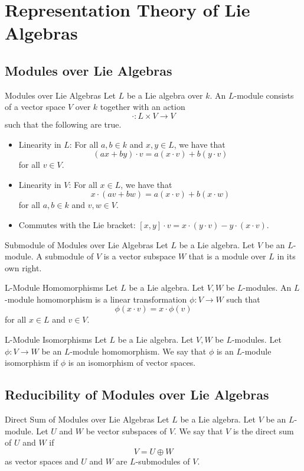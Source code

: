 \documentclass[a4paper]{article}
\begin{document}
\pagebreak
\section{Representation Theory of Lie Algebras}
\subsection{Modules over Lie Algebras}
\begin{defn}{Modules over Lie Algebras}{} Let $L$ be a Lie algebra over $k$. An $L$-module consists of a vector space $V$ over $k$ together with an action $$\cdot:L\times V\to V$$ such that the following are true. 
\begin{itemize}
\item Linearity in $L$: For all $a,b\in k$ and $x,y\in L$, we have that $$(ax+by)\cdot v=a(x\cdot v)+b(y\cdot v)$$ for all $v\in V$. 
\item Linearity in $V$: For all $x\in L$, we have that $$x\cdot(av+bw)=a(x\cdot v)+b(x\cdot w)$$ for all $a,b\in k$ and $v,w\in V$. 
\item Commutes with the Lie bracket: $[x,y]\cdot v=x\cdot(y\cdot v)-y\cdot(x\cdot v)$. 
\end{itemize}
\end{defn}

\begin{defn}{Submodule of Modules over Lie Algebras}{} Let $L$ be a Lie algebra. Let $V$ be an $L$-module. A submodule of $V$ is a vector subspace $W$ that is a module over $L$ in its own right. 
\end{defn}

\begin{defn}{L-Module Homomorphisms}{} Let $L$ be a Lie algebra. Let $V,W$ be $L$-modules. An $L$-module homomorphism is a linear transformation $\phi:V\to W$ such that $$\phi(x\cdot v)=x\cdot\phi(v)$$ for all $x\in L$ and $v\in V$. 
\end{defn}

\begin{defn}{L-Module Isomorphisms}{} Let $L$ be a Lie algebra. Let $V,W$ be $L$-modules. Let $\phi:V\to W$ be an $L$-module homomorphism. We say that $\phi$ is an $L$-module isomorphism if $\phi$ is an isomorphism of vector spaces. 
\end{defn}

\subsection{Reducibility of Modules over Lie Algebras}
\begin{defn}{Direct Sum of Modules over Lie Algebras}{} Let $L$ be a Lie algebra. Let $V$ be an $L$-module. Let $U$ and $W$ be vector subspaces of $V$. We say that $V$ is the direct sum of $U$ and $W$ if $$V=U\oplus W$$ as vector spaces and $U$ and $W$ are $L$-submodules of $V$. 
\end{defn}
\end{document}
